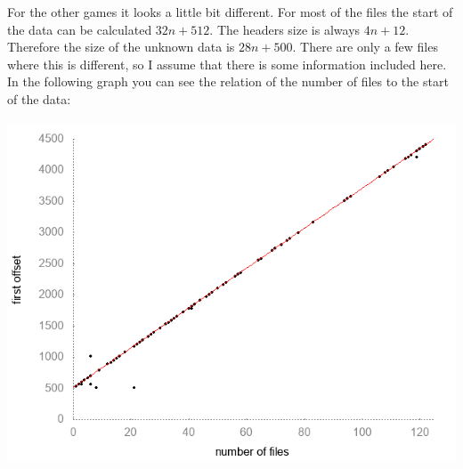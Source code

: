 \documentclass[a4paper]{scrartcl}
\begin{document}
For the other games it looks a little bit different. For most of the files the start of the data can be calculated \(32n + 512\). The headers size is always \(4n + 12\). Therefore the size of the unknown data is \(28n+500\). There are only a few files where this is different, so I assume that there is some information included here. In the following graph you can see the relation of the number of files to the start of the data:\\\\
\includegraphics[width=\textwidth]{format-unknown1.png}
\end{document}
